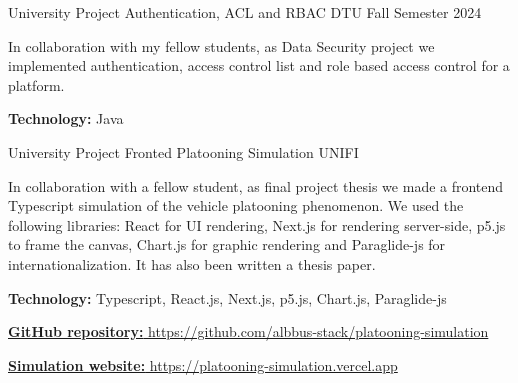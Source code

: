 \begin{cventries}
  \cventry
    {University Project} %
    {Authentication, ACL and RBAC} %
    {DTU} %
    {Fall Semester 2024} %
    {
      \begin{cvitems} %
        \item {In collaboration with my fellow students, as Data Security project we implemented authentication, access control list and role based access control for a platform.}
        \item {\textbf{Technology:} Java}
        \item {}
      \end{cvitems}
    }

\begin{comment}
  \cventry
    {University Project} %
    {Automated Verification} %
    {DTU} %
    {Fall Semester 2024} %
    {
      \begin{cvitems} %
        \item {In collaboration with my fellow students, as Program Verification project we implemented an automated verification tool for slang.}
        \item {\textbf{Technology:} Rust, Viper}
        \item {\href{https://github.com/tornado80/program-verification-project1}{\textbf{GitHub repository:} https://github.com/tornado80/program-verification-project1}}
      \end{cvitems}
    }
    
\end{comment}

  \cventry
    {University Project} %
    {Fronted Platooning Simulation} %
    {UNIFI} %
    {} %
    {
      \begin{cvitems} %
        \item {In collaboration with a fellow student, as final project thesis we made a frontend Typescript simulation of the vehicle platooning phenomenon. We used the following libraries: React for UI rendering, Next.js for rendering server-side, p5.js to frame the canvas, Chart.js for graphic rendering and Paraglide-js for internationalization. It has also been written a thesis paper.}
        \item {\textbf{Technology:} Typescript, React.js, Next.js, p5.js, Chart.js, Paraglide-js}
        \item {\href{https://github.com/albbus-stack/platooning-simulation}{\textbf{GitHub repository:} https://github.com/albbus-stack/platooning-simulation}}
        \item {\href{https://platooning-simulation.vercel.app}{\textbf{Simulation website:} https://platooning-simulation.vercel.app}}
      \end{cvitems}
    }


\end{cventries}
